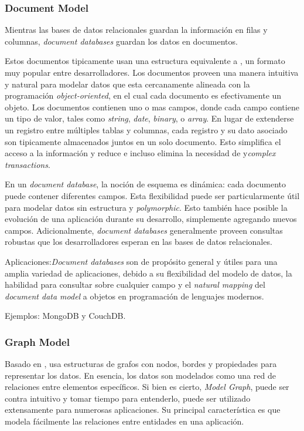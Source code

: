 \subsubsection{Document Model}\label{cap:justificacion_proyecto:base_datos:nosql:document_model}

 Mientras las bases de datos relacionales guardan la información en filas y columnas, \textit{document databases} guardan los datos en documentos.  

Estos documentos tipicamente usan una estructura equivalente a \json, un formato muy popular entre desarrolladores. Los documentos proveen una manera intuitiva y natural para modelar datos que esta cercanamente alineada con la programación \textit{object-oriented}, en el cual cada documento es efectivamente un objeto. Los documentos contienen uno o mas campos, donde cada campo contiene un tipo de valor, tales como \textit{string}, \textit{date}, \textit{binary}, o \textit{array}. En lugar de extenderse un registro entre múltiples tablas y columnas, cada registro y su dato asociado son tipicamente almacenados juntos en un solo documento. Esto simplifica el acceso a la información y reduce e incluso elimina la necesidad de \joins y\textit{complex transactions}.

En un \textit{document database}, la noción de esquema es dinámica: cada documento puede contener diferentes campos. Esta flexibilidad puede ser particularmente útil para modelar datos sin estructura y \textit{polymorphic}. Esto también hace posible la evolución de una aplicación durante su desarrollo, simplemente agregando nuevos campos. Adicionalmente, \textit{document databases} generalmente proveen consultas robustas que los desarrolladores esperan en las bases de datos relacionales.

Aplicaciones:\textit{Document databases} son de propósito general y útiles para una amplia variedad de aplicaciones, debido a su flexibilidad del modelo de datos, la habilidad para consultar sobre cualquier campo y el \textit{natural mapping} del \textit{document data model} a objetos en programación de lenguajes modernos.

Ejemplos: MongoDB y CouchDB.

\subsubsection{Graph Model}
\label{cap:justificacion_proyecto:base_datos:nosql:graph_model}

Basado en , usa estructuras de grafos con nodos, bordes y propiedades para representar los datos. En esencia, los datos son modelados como una red de relaciones entre elementos específicos. Si bien es cierto, \textit{Model Graph}, puede ser contra intuitivo y tomar tiempo para entenderlo, puede ser utilizado extensamente para numerosas aplicaciones. Su principal característica es que modela fácilmente las relaciones entre entidades en una aplicación.

